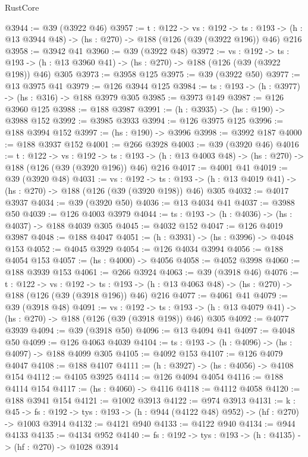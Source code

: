 \begin{lexlean}{RustCore}
\begin{coremodule}
@3944 := @39 (@3922 @46)
@3957 := {t : @122} ->
  {vs : @192} ->
  {ts : @193} -> (h : @13 @3944 @48) -> (hs : @270) -> @188 (@126 (@39 (@3922 @196)) @46) @216
@3958 := @3942 @41
@3960 := @39 (@3922 @48)
@3972 := {vs : @192} ->
  {ts : @193} -> (h : @13 @3960 @41) -> (hs : @270) -> @188 (@126 (@39 (@3922 @198)) @46) @305
@3973 := @3958 @125
@3975 := @39 (@3922 @50)
@3977 := @13 @3975 @41
@3979 := @126 @3944 @125
@3984 := {ts : @193} -> (h : @3977) -> (hs : @316) -> @188 @3979 @305
@3985 := @3973 @149
@3987 := @126 @3960 @125
@3988 := @188 @3987
@3991 := (h : @3935) -> (hs : @190) -> @3988 @152
@3992 := @3985 @3933
@3994 := @126 @3975 @125
@3996 := @188 @3994 @152
@3997 := (hs : @190) -> @3996
@3998 := @3992 @187
@4000 := @188 @3937 @152
@4001 := @266 @3928
@4003 := @39 (@3920 @46)
@4016 := {t : @122} ->
  {vs : @192} ->
  {ts : @193} -> (h : @13 @4003 @48) -> (hs : @270) -> @188 (@126 (@39 (@3920 @196)) @46) @216
@4017 := @4001 @41
@4019 := @39 (@3920 @48)
@4031 := {vs : @192} ->
  {ts : @193} -> (h : @13 @4019 @41) -> (hs : @270) -> @188 (@126 (@39 (@3920 @198)) @46) @305
@4032 := @4017 @3937
@4034 := @39 (@3920 @50)
@4036 := @13 @4034 @41
@4037 := @3988 @50
@4039 := @126 @4003 @3979
@4044 := {ts : @193} -> (h : @4036) -> (hs : @4037) -> @188 @4039 @305
@4045 := @4032 @152
@4047 := @126 @4019 @3987
@4048 := @188 @4047
@4051 := (h : @3931) -> (hs : @3996) -> @4048 @153
@4052 := @4045 @3929
@4054 := @126 @4034 @3994
@4056 := @188 @4054 @153
@4057 := (hs : @4000) -> @4056
@4058 := @4052 @3998
@4060 := @188 @3939 @153
@4061 := @266 @3924
@4063 := @39 (@3918 @46)
@4076 := {t : @122} ->
  {vs : @192} ->
  {ts : @193} -> (h : @13 @4063 @48) -> (hs : @270) -> @188 (@126 (@39 (@3918 @196)) @46) @216
@4077 := @4061 @41
@4079 := @39 (@3918 @48)
@4091 := {vs : @192} ->
  {ts : @193} -> (h : @13 @4079 @41) -> (hs : @270) -> @188 (@126 (@39 (@3918 @198)) @46) @305
@4092 := @4077 @3939
@4094 := @39 (@3918 @50)
@4096 := @13 @4094 @41
@4097 := @4048 @50
@4099 := @126 @4063 @4039
@4104 := {ts : @193} -> (h : @4096) -> (hs : @4097) -> @188 @4099 @305
@4105 := @4092 @153
@4107 := @126 @4079 @4047
@4108 := @188 @4107
@4111 := (h : @3927) -> (hs : @4056) -> @4108 @154
@4112 := @4105 @3925
@4114 := @126 @4094 @4054
@4116 := @188 @4114 @154
@4117 := (hs : @4060) -> @4116
@4118 := @4112 @4058
@4120 := @188 @3941 @154
@4121 := @1002 @3913
@4122 := @974 @3913
@4131 := {k : @45} ->
  {fs : @192} -> {tys : @193} -> (h : @944 (@4122 @48) @952) -> (hf : @270) -> @1003 @3914
@4132 := @4121 @940
@4133 := @4122 @940
@4134 := @944 @4133
@4135 := @4134 @952
@4140 := {fs : @192} -> {tys : @193} -> (h : @4135) -> (hf : @270) -> @1028 @3914

\end{coremodule}
\end{lexlean}
